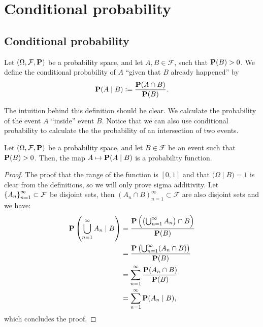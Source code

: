 \documentclass[11pt,a4paper]{article}
\begin{document}
\newpage

\section{Conditional probability}
\subsection{Conditional probability}
\begin{definition}
  Let $(\Omega, \mathcal F, \mathbf{P})$ be a probability space, and let
  $A,B \in \mathcal F$, such that $\mathbf{P}(B) > 0$. We define the
  conditional probability of $A$ ``given that $B$ already happened'' by
  \[
    \mathbf{P}(A \mid B) := \frac{\mathbf{P}(A \cap B)}{\mathbf{P}(B)}.
  \]
\end{definition}

\begin{remark}
  The intuition behind this definition should be clear. We calculate the 
  probability of the event $A$ ``inside'' event $B$.
  Notice that we can also use conditional probability to calculate the
  the probability of an intersection of two events.
\end{remark}

\begin{proposition}
  Let $(\Omega, \mathcal F, \mathbf{P})$ be a probability space,
  and let $B \in \mathcal F$ be an event such that $\mathbf{P}(B) > 0$.
  Then, the map $A \mapsto \mathbf{P}(A \mid B)$ is a probability function.
\end{proposition}

\begin{proof}
  The proof that the range of the function is $[0,1]$ and that 
  $\mathbf (\Omega \mid B) = 1$ is clear from the definitions,
  so we will only prove sigma additivity.
  Let $\left\{A_n\right\}_{n=1}^{\infty} \subset \mathcal F$ be disjoint sets, then
  $(A_n \cap B)_{n=1}^{\infty} \subset \mathcal F$ are also disjoint sets
  and we have:
    \begin{align*}
      \mathbf{P}\left( \bigcup_{n=1}^{\infty} A_n \mid B \right) 
      & = \frac{\mathbf{P}\left( \left( \bigcup_{n=1}^{\infty} A_n \right) \cap B \right)}{\mathbf{P}(B)} \\
      & = \frac{\mathbf{P}\left( \bigcup_{n=1}^{\infty} (A_n \cap B) \right)}{\mathbf{P}(B)} \\
      & = \sum_{n=1}^{\infty} \frac{\mathbf{P}(A_n \cap B)}{\mathbf{P}(B)} \\
      & = \sum_{n=1}^{\infty} \mathbf{P}(A_n \mid B),
    \end{align*}
  which concludes the proof.
\end{proof}
\end{document}

